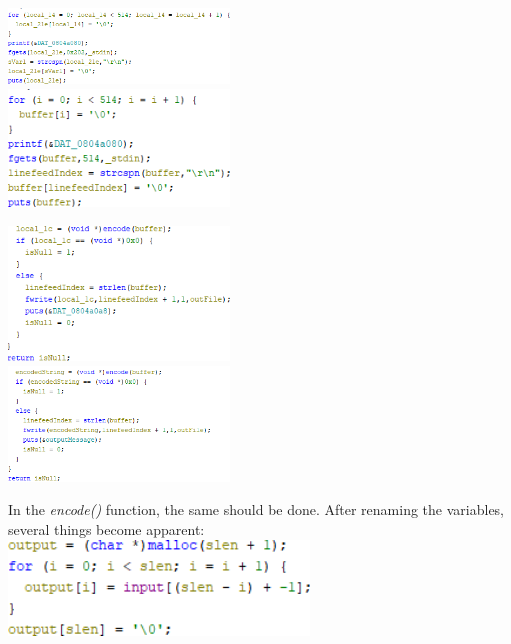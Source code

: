 \documentclass{article}
\begin{document}
\newpage
\begin{multicols}{2}
    \includegraphics[width=0.44\textwidth]{"image70.png"} \\
    \columnbreak
    \includegraphics[width=0.44\textwidth]{"image71.png"}
\end{multicols}
\vspace{10mm}
\begin{multicols}{2}
    \includegraphics[width=0.44\textwidth]{"image72.png"} \\
    \columnbreak
    \includegraphics[width=0.44\textwidth]{"image73.png"}
\end{multicols}
\vspace{10mm}
In the \textit{encode()} function, the same should be done. After renaming the variables, several things become apparent:
\vspace{3mm} \\
\includegraphics[width=0.6\textwidth]{"image74.png"}
\vspace{3mm} \\
\end{document}

